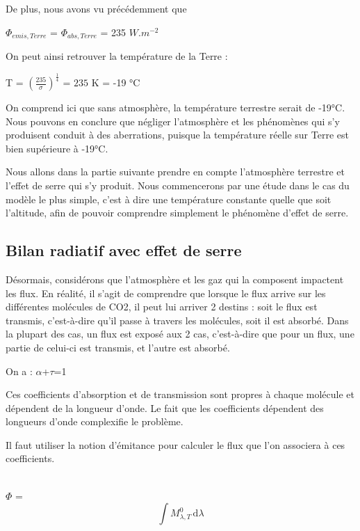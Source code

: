 \documentclass[a4paper, 12pt]{report} %
\begin{document}
De plus, nous avons vu précédemment que
\begin{center}
$\Phi_{emis,Terre}$ = $\Phi_{abs,Terre}$  = 235 $W.m^{-2}$
\end{center} \vspace{\baselineskip}

On peut ainsi retrouver la température de la Terre :
\begin{center}
T = $(\frac{235}{\sigma})^{\frac{1}{4}}$ = $235$ K = -19 °C
\end{center} \vspace{\baselineskip}

On comprend ici que sans atmosphère, la température terrestre
serait de -19°C. Nous pouvons en conclure que négliger l'atmosphère et les phénomènes qui s'y produisent
conduit à des aberrations, puisque la température réelle
sur Terre est bien supérieure à -19°C.

Nous allons dans la partie suivante prendre en compte l'atmosphère terrestre et l'effet de serre qui s'y produit. Nous commencerons par une étude dans le cas du modèle le plus simple, c'est à dire une température constante quelle que soit l'altitude, afin de pouvoir comprendre simplement le phénomène d'effet de serre.


\subsection{Bilan radiatif avec effet de serre}

Désormais, considérons que l’atmosphère et les gaz qui la composent impactent les flux. En réalité, il s’agit de comprendre que lorsque le flux arrive sur les différentes molécules de CO2, il peut lui arriver 2 destins : soit le flux est transmis, c’est-à-dire qu’il passe à travers les molécules, soit il est absorbé. Dans la plupart des cas, un flux est exposé aux 2 cas, c’est-à-dire que pour un flux, une partie de celui-ci est transmis, et l’autre est absorbé.

On a :  $\alpha$+$\tau$=1

Ces coefficients d'absorption et de transmission sont propres à chaque molécule et dépendent de la longueur d’onde. Le fait que les coefficients dépendent des longueurs d’onde complexifie le problème. 

Il faut utiliser la notion d'émitance pour calculer le flux que l'on associera à ces coefficients.  

\begin{center}\\
	$\Phi$ =\[ \int M^0_{\lambda,T} \, \mathrm{d}\lambda \]
   \end{center}\\
\end{document}
